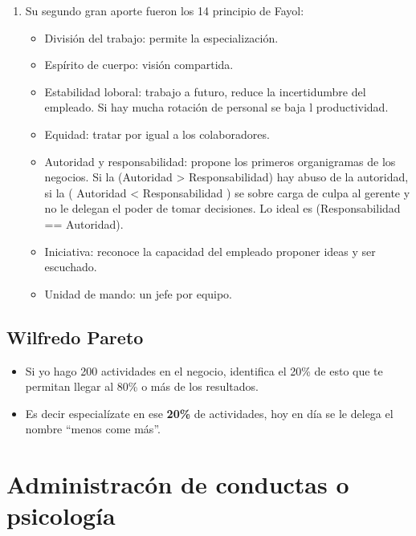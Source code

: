 \begin{itemize}
\begin{enumerate}
            \item Su segundo gran aporte fueron los 14 principio de Fayol:
                \begin{itemize}
                    \item División del trabajo: permite la especialización.
                    \item Espírito de cuerpo: visión compartida.
                    \item Estabilidad loboral: trabajo a futuro, reduce la incertidumbre del empleado. Si hay mucha rotación de personal se baja l productividad.
                    \item Equidad: tratar por igual a los colaboradores.
                    \item Autoridad y responsabilidad: propone los primeros organigramas de los negocios. Si la (Autoridad > Responsabilidad) hay abuso de la autoridad, si la ( Autoridad < Responsabilidad ) se sobre carga de culpa al gerente y no le delegan el poder de tomar decisiones. Lo ideal es (Responsabilidad == Autoridad).
                    \item Iniciativa: reconoce la capacidad del empleado proponer ideas y ser escuchado.
                    \item Unidad de mando: un jefe por equipo.
                \end{itemize}
        \end{enumerate}
\end{itemize}


\subsection{Wilfredo Pareto}
\begin{itemize}
    \item Si yo hago 200 actividades en el negocio, identifica el 20\% de esto que te permitan llegar al 80\% o más de los resultados. 
    \item Es decir especialízate en ese \textbf{20\%} de actividades, hoy en día se le delega el nombre ``menos come más''.
\end{itemize}


\section{Administracón de conductas o psicología}
